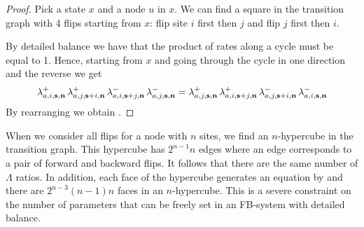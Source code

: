 \begin{proof}
  Pick a state $x$ and a node $u$ in $x$.
  We can find a square in the transition graph
  with 4 flips starting from $x$:
  flip site $i$ first then $j$ and flip $j$ first then $i$.
  \begin{center}
  \end{center}
  By detailed balance we have that
  the product of rates along a cycle must be equal to 1.
  Hence, starting from $x$ and going through the cycle
  in one direction and the reverse we get
  \begin{equation*}
    \lambda^+_{a,i,\boldsymbol{\mathbf{s}},\boldsymbol{\mathbf{n}}} \,
    \lambda^+_{a,j,\boldsymbol{\mathbf{s}}+i,\boldsymbol{\mathbf{n}}} \,
    \lambda^-_{a,i,\boldsymbol{\mathbf{s}}+j,\boldsymbol{\mathbf{n}}} \,
    \lambda^-_{a,j,\boldsymbol{\mathbf{s}},\boldsymbol{\mathbf{n}}} =
    \lambda^+_{a,j,\boldsymbol{\mathbf{s}},\boldsymbol{\mathbf{n}}} \,
    \lambda^+_{a,i,\boldsymbol{\mathbf{s}}+j,\boldsymbol{\mathbf{n}}} \,
    \lambda^-_{a,j,\boldsymbol{\mathbf{s}}+i,\boldsymbol{\mathbf{n}}} \,
    \lambda^-_{a,i,\boldsymbol{\mathbf{s}},\boldsymbol{\mathbf{n}}}
  \end{equation*}
  By rearranging we obtain .
\end{proof}

When we consider all flips for a node with $n$ sites,
we find an $n$-hypercube in the transition graph.
This hypercube has $2^{n-1} n$ edges
where an edge corresponds to a pair of forward and backward flips.
It follows that there are the same number of $\Lambda$ ratios.
In addition, each face of the hypercube generates an equation
by  %
and there are $2^{n-3} (n-1) n$ faces in an $n$-hypercube.
This is a severe constraint on the number of parameters
that can be freely set in an FB-system with detailed balance.






